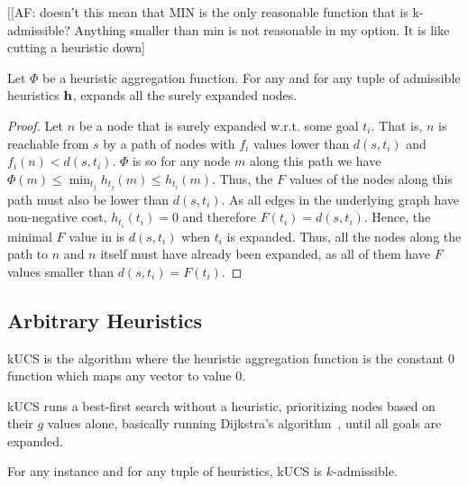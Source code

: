 [[AF: doesn't this mean that MIN is the only reasonable function that is k-admissible? Anything smaller than min is not reasonable in my option. It is like cutting a heuristic down]

\begin{theorem}
  \label{the:kastarmin-surely}
  Let $\Phi$ be a \axiomadm heuristic aggregation function. For any \kgs and for any tuple of admissible heuristics $\mathbf{h}$, \kastarphi expands all the surely expanded nodes.
\end{theorem}
\begin{proof}
  Let $n$ be a node that is surely expanded w.r.t. some goal $t_i$.
  That is, $n$ is reachable from $s$ by a path of nodes with $f_i$ values lower than $d(s, t_i)$ and $f_i(n) < d(s, t_i)$.
  $\Phi$ is \axiomadm so for any node $m$ along this path we have $\Phi(m) \leq \min_{t_j} h_{t_j}(m) \leq h_{t_i}(m)$.
  Thus, the $F$ values of the nodes along this path must also be lower than $d(s, t_i)$.
  As all edges in the underlying graph have non-negative cost, $h_{t_i}(t_i) = 0$ and therefore $F(t_i) = d(s, t_i)$.
  Hence, the minimal $F$ value in \open is $d(s, t_i)$ when $t_i$ is expanded.
  Thus, all the nodes along the path to $n$ and $n$ itself must have already been expanded, as all of them have $F$ values smaller than $d(s, t_i) = F(t_i)$.
\end{proof}


\subsection{Arbitrary Heuristics}

\begin{definition}
  \label{def:ucs}
  \ac{kUCS} is the  algorithm where the heuristic aggregation function is the constant 0 function which maps any vector to value 0.
\end{definition}
\ac{kUCS} runs a best-first search without a heuristic, prioritizing nodes based on their $g$ values alone, basically running Dijkstra's algorithm~\cite{DIJ59,Felner2011}, until all goals are expanded.  %

\begin{theorem}
  \label{thm:arbitrary}
  For any \kgs instance and for any tuple of heuristics, \ac{kUCS} is $k$-admissible.
\end{theorem}

